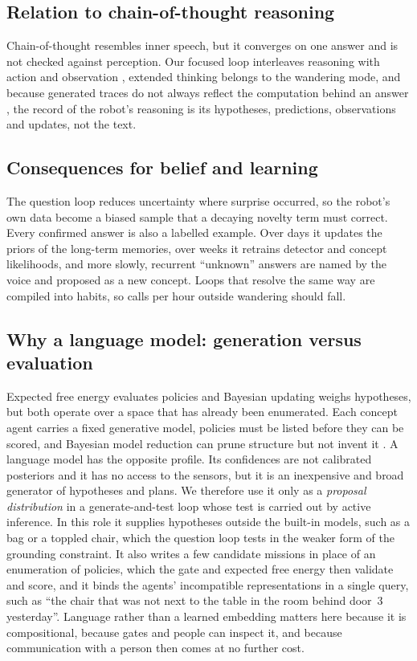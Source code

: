 \subsection{Relation to chain-of-thought reasoning}
\label{sec:inner_speech:cot}

Chain-of-thought resembles inner speech, but it converges on one answer and is not checked against perception. Our
focused loop interleaves reasoning with
action and observation \cite{yao2023react}, extended thinking belongs to the wandering mode, and because generated
traces do not always reflect the computation behind an answer \cite{turpin2023language}, the record of the robot's
reasoning is its hypotheses, predictions, observations and updates, not the text.

\subsection{Consequences for belief and learning}
\label{sec:inner_speech:learning}

The question loop reduces uncertainty where surprise occurred, so the robot's own data become a biased sample that a
decaying novelty term \cite{schwartenbeck2019curiosity} must correct. Every confirmed answer is also a labelled example. Over days it updates the priors of the long-term
memories, over weeks it retrains detector and concept likelihoods, and more slowly, recurrent ``unknown'' answers are
named by the voice and proposed as a new concept. Loops that resolve the same way are compiled into habits, so
calls per hour outside wandering should fall.

\subsection{Why a language model: generation versus evaluation}
\label{sec:inner_speech:why_lm}

Expected free energy evaluates policies and Bayesian updating weighs hypotheses, but both operate over a space that
has already been enumerated. Each concept agent carries a fixed generative model, policies must be listed before they
can be scored, and Bayesian model reduction can prune structure but not invent it \cite{friston2017curiosity}. A
language model has the opposite profile. Its confidences are not calibrated posteriors and it has no access to the
sensors, but it is an inexpensive and broad generator of hypotheses and plans. We therefore use it only as a
\emph{proposal distribution} in a generate-and-test loop whose test is carried out by active inference. In this role
it supplies hypotheses outside the built-in models, such as a bag or a toppled chair, which the question loop tests
in the weaker form of the grounding constraint. It also writes a few candidate missions in place of an enumeration of
policies, which the gate and expected free energy then validate and score, and it binds the agents' incompatible
representations in a single query, such as ``the chair that was not next to the table in the room behind door~3
yesterday''. Language rather than a learned embedding matters here because it is compositional, because gates and
people can inspect it, and because communication with a person then comes at no further cost.

